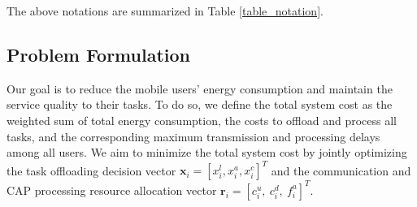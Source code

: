 \documentclass[10pt,journal,compsoc]{IEEEtran}
\begin{document}
The above notations are summarized in Table \ref{table_notation}.

\subsection{Problem Formulation}
Our goal is to reduce the mobile users' energy consumption and
maintain the service quality to their tasks. To do so, we define the
total system cost as the weighted sum of total energy consumption,
the costs to offload and process all tasks, and the corresponding
maximum transmission and processing delays among all users. We aim
to minimize the total system cost by jointly optimizing the task
offloading decision vector $\mathbf{x}_i = [x^l_i, x^a_i, x^c_i]^T$
and the communication and CAP processing resource allocation vector
$\textbf{r}_i=[c^u_{i},\ c^d_{i},\ f^a_{i}]^T$.
\end{document}
